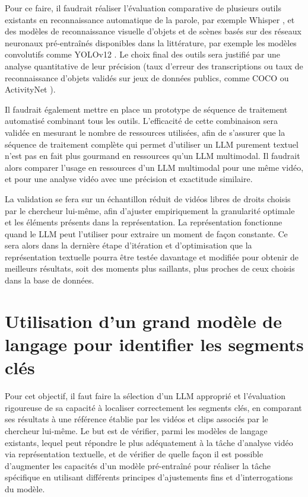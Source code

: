Pour ce faire, il faudrait réaliser l'évaluation comparative de plusieurs outils existants en reconnaissance automatique de la parole, par exemple Whisper \cite{radford2023_whisper}, et des modèles de reconnaissance visuelle d'objets et de scènes basés sur des réseaux neuronaux pré-entraînés disponibles dans la littérature, par exemple les modèles convolutifs comme YOLOv12 \cite{tian2025yolov12}. Le choix final des outils sera justifié par une analyse quantitative de leur précision (taux d'erreur des transcriptions ou taux de reconnaissance d'objets validés sur jeux de données publics, comme COCO \cite{lin2014_coco} ou ActivityNet \cite{heilbron2015_activitynet}). 

Il faudrait également mettre en place un prototype de séquence de traitement automatisé combinant tous les outils. L'efficacité de cette combinaison sera validée en mesurant le nombre de ressources utilisées, afin de s'assurer que la séquence de traitement complète qui permet d'utiliser un LLM purement textuel n'est pas en fait plus gourmand en ressources qu'un LLM multimodal. Il faudrait alors comparer l'usage en ressources d'un LLM multimodal pour une même vidéo, et pour une analyse vidéo avec une précision et exactitude similaire. 

La validation se fera sur un échantillon réduit de vidéos libres de droits choisis par le chercheur lui-même, afin d'ajuster empiriquement la granularité optimale et les éléments présents dans la représentation. La représentation fonctionne quand le LLM peut l'utiliser pour extraire un moment de façon constante. Ce sera alors dans la dernière étape d'itération et d'optimisation que la représentation textuelle pourra être testée davantage et modifiée pour obtenir de meilleurs résultats, soit des moments plus saillants, plus proches de ceux choisis dans la base de données.

\section{Utilisation d'un grand modèle de langage pour identifier les segments clés}

Pour cet objectif, il faut faire la sélection d'un LLM approprié et l'évaluation rigoureuse de sa capacité à localiser correctement les segments clés, en comparant ses résultats à une référence établie par les vidéos et clips associés par le chercheur lui-même. Le but est de vérifier, parmi les modèles de langage existants, lequel peut répondre le plus adéquatement à la tâche d'analyse vidéo via représentation textuelle, et de vérifier de quelle façon il est possible d'augmenter les capacités d'un modèle pré-entraîné pour réaliser la tâche spécifique en utilisant différents principes d'ajustements fins et d'interrogations du modèle.

